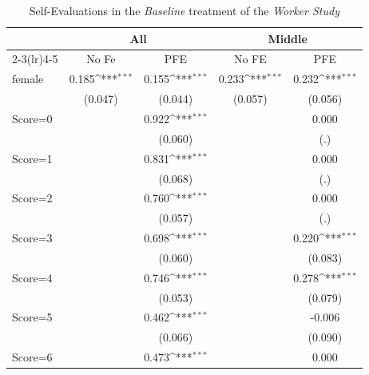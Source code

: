 \begin{table}[htbp]\centering
\def\sym#1{\ifmmode^{#1}\else\(^{#1}\)\fi}
\caption{Self-Evaluations in the \textit{Baseline} treatment of the \textit{Worker Study}}
\begin{tabular}{l*{4}{c}}
\hline\hline
                &\multicolumn{2}{c}{All}              &\multicolumn{2}{c}{Middle}           \\\cmidrule(lr){2-3}\cmidrule(lr){4-5}
                &\multicolumn{1}{c}{No Fe}&\multicolumn{1}{c}{PFE}&\multicolumn{1}{c}{No FE}&\multicolumn{1}{c}{PFE}\\
\hline
female          &    0.185\sym{***}&    0.155\sym{***}&    0.233\sym{***}&    0.232\sym{***}\\
                &  (0.047)         &  (0.044)         &  (0.057)         &  (0.056)         \\
Score=0         &                  &    0.922\sym{***}&                  &    0.000         \\
                &                  &  (0.060)         &                  &      (.)         \\
Score=1         &                  &    0.831\sym{***}&                  &    0.000         \\
                &                  &  (0.068)         &                  &      (.)         \\
Score=2         &                  &    0.760\sym{***}&                  &    0.000         \\
                &                  &  (0.057)         &                  &      (.)         \\
Score=3         &                  &    0.698\sym{***}&                  &    0.220\sym{***}\\
                &                  &  (0.060)         &                  &  (0.083)         \\
Score=4         &                  &    0.746\sym{***}&                  &    0.278\sym{***}\\
                &                  &  (0.053)         &                  &  (0.079)         \\
Score=5         &                  &    0.462\sym{***}&                  &   -0.006         \\
                &                  &  (0.066)         &                  &  (0.090)         \\
Score=6         &                  &    0.473\sym{***}&                  &    0.000         \\

\end{tabular}
\end{table}
